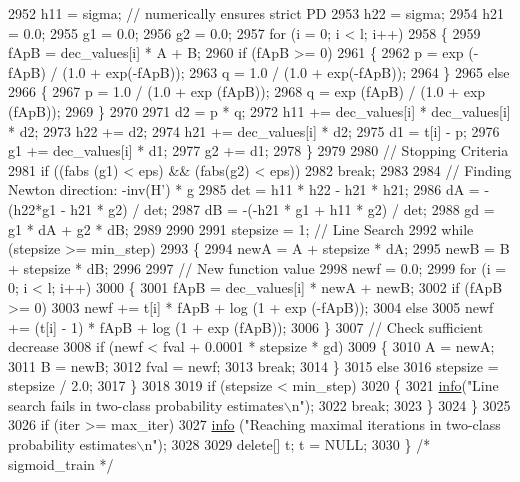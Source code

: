 \begin{DoxyCode}
2952     h11 = sigma; \textcolor{comment}{// numerically ensures strict PD}
2953     h22 = sigma;
2954     h21 = 0.0;
2955     g1  = 0.0;
2956     g2  = 0.0;
2957     \textcolor{keywordflow}{for}  (i = 0;  i < l;  i++)
2958     \{
2959       fApB = dec\_values[i] * A + B;
2960       \textcolor{keywordflow}{if}  (fApB >= 0)
2961       \{
2962         p = exp (-fApB) / (1.0 + exp(-fApB));
2963         q = 1.0 / (1.0 + exp(-fApB));
2964       \}
2965       \textcolor{keywordflow}{else}
2966       \{
2967         p = 1.0 / (1.0 + exp (fApB));
2968         q = exp (fApB) / (1.0 + exp (fApB));
2969       \}
2970 
2971       d2   = p * q;
2972       h11  += dec\_values[i] * dec\_values[i] * d2;
2973       h22  += d2;
2974       h21  += dec\_values[i] * d2;
2975       d1   = t[i] - p;
2976       g1   += dec\_values[i] * d1;
2977       g2   += d1;
2978     \}
2979 
2980     \textcolor{comment}{// Stopping Criteria}
2981     \textcolor{keywordflow}{if}  ((fabs (g1) < eps)  &&  (fabs(g2) < eps))
2982       \textcolor{keywordflow}{break};
2983 
2984     \textcolor{comment}{// Finding Newton direction: -inv(H') * g}
2985     det = h11 * h22  -  h21 * h21;
2986     dA  = -(h22*g1 - h21 * g2) / det;
2987     dB  = -(-h21 * g1  +  h11 * g2) / det;
2988     gd  = g1 * dA  +  g2 * dB;
2989 
2990 
2991     stepsize = 1;    \textcolor{comment}{// Line Search}
2992     \textcolor{keywordflow}{while} (stepsize >= min\_step)
2993     \{
2994       newA = A + stepsize * dA;
2995       newB = B + stepsize * dB;
2996 
2997       \textcolor{comment}{// New function value}
2998       newf = 0.0;
2999       \textcolor{keywordflow}{for} (i = 0;  i < l;  i++)
3000       \{
3001         fApB = dec\_values[i] * newA + newB;
3002         \textcolor{keywordflow}{if} (fApB >= 0)
3003           newf += t[i] * fApB + log (1 + exp (-fApB));
3004         \textcolor{keywordflow}{else}
3005           newf += (t[i] - 1) * fApB + log (1 + exp (fApB));
3006       \}
3007       \textcolor{comment}{// Check sufficient decrease}
3008       \textcolor{keywordflow}{if} (newf < fval + 0.0001 * stepsize * gd)
3009       \{
3010         A    = newA;
3011         B    = newB;
3012         fval = newf;
3013         \textcolor{keywordflow}{break};
3014       \}
3015       \textcolor{keywordflow}{else}
3016         stepsize = stepsize / 2.0;
3017     \}
3018 
3019     \textcolor{keywordflow}{if} (stepsize < min\_step)
3020     \{
3021       \hyperlink{svm289___b_f_s_8cpp_ab834c069665121a3467868539fde9101}{info}(\textcolor{stringliteral}{"Line search fails in two-class probability estimates\(\backslash\)n"});
3022       \textcolor{keywordflow}{break};
3023     \}
3024   \}
3025 
3026   \textcolor{keywordflow}{if}  (iter >= max\_iter)
3027     \hyperlink{svm289___b_f_s_8cpp_ab834c069665121a3467868539fde9101}{info} (\textcolor{stringliteral}{"Reaching maximal iterations in two-class probability estimates\(\backslash\)n"});
3028 
3029   \textcolor{keyword}{delete}[]  t;  t = NULL;
3030 \}  \textcolor{comment}{/* sigmoid\_train */}
\end{DoxyCode}

